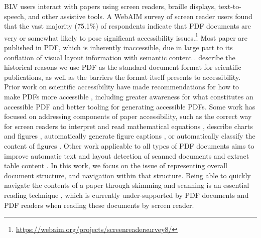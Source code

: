 BLV users interact with papers using screen readers, braille displays, text-to-speech, and other assistive tools. A WebAIM survey of screen reader users found that the vast majority (75.1\%) of respondents indicate that PDF documents are very or somewhat likely to pose significant accessibility issues.\footnote{\href{https://webaim.org/projects/screenreadersurvey8/}{https://webaim.org/projects/screenreadersurvey8/}} Most paper are published in PDF, which is inherently inaccessible, due in large part to its conflation of visual layout information with semantic content \citep{NielsenPDFStillUnfit, Bigham2016AnUT}. 
\citet{Bigham2016AnUT} describe the historical reasons we use PDF as the standard document format for scientific publications, as well as the barriers the format itself presents to accessibility. Prior work on scientific accessibility have made recommendations for how to make PDFs more accessible \cite{Rajkumar2020PDFAO, Darvishy2018PDFAT}, including greater awareness for what constitutes an accessible PDF and better tooling for generating accessible PDFs. Some work has focused on addressing components of paper accessibility, such as the correct way for screen readers to interpret and read mathematical equations \citep{Flores2010MathMLTA, Bates2010SpokenMU, Sorge2014TowardsMM, Mackowski2017MultimediaPF, Ahmetovic2018AxessibilityAL, Ferreira2004EnhancingTA, Sojka2013AccessibilityII}, describe charts and figures \citep{Elzer2008AccessibleBC, Engel2017TowardsAC, Engel2019SVGPlottAA}, automatically generate figure captions \citep{Chen2019NeuralCG, Qian2020AFS}, or automatically classify the content of figures \citep{Kim2018MultimodalDL}. Other work applicable to all types of PDF documents aims to improve automatic text and layout detection of scanned documents \cite{Nazemi2014PracticalSM} and extract table content \cite{Fan2015TableRD, Rastan2019TEXUSAU}. In this work, we focus on the issue of representing overall document structure, and navigation within that structure. Being able to quickly navigate the contents of a paper through skimming and scanning is an essential reading technique \citep{Maxwell1972SkimmingAS}, which is currently under-supported by PDF documents and PDF readers when reading these documents by screen reader. 

